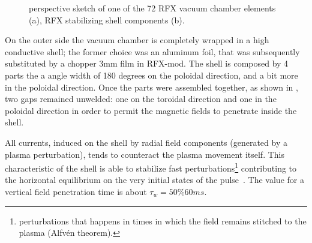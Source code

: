 \begin{figure}[ht!]
\centering
{}
\caption{ perspective sketch of one of the 72 RFX vacuum chamber elements (a), RFX stabilizing shell components (b). }
\end{figure}
On the outer side the vacuum chamber is completely wrapped in a high conductive shell; the former choice was an aluminum foil, that was subsequently substituted by a chopper 3mm film in RFX-mod. The shell is composed by 4 parts the a angle width of 180 degrees on the poloidal direction, and a bit more in the poloidal direction. Once the parts were assembled together, as shown in \Figure{\ref{fig:rfx_shell}}, two gaps remained unwelded: one on the toroidal direction and one in the poloidal direction in order to permit the magnetic fields to penetrate inside the shell\cite{th13}.

All currents, induced on the shell by radial field components (generated by a plasma perturbation), tends to counteract the plasma movement itself. This characteristic of the shell is able to stabilize fast perturbations\footnote{perturbations that happens in times in which the field remains stitched to the plasma (Alfv\'en theorem).} contributing to the horizontal equilibrium on the very initial states of the pulse~\cite{th19}. The value for a vertical field penetration time is about $\tau_w = 50 \% 60 ms$\cite{th12}.


